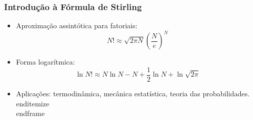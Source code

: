 \documentclass[11pt]{beamer}
\begin{document}
\begin{frame}

\begin{frame}
\frametitle{Introdução à Fórmula de Stirling}
\begin{itemize}
\item Aproximação assintótica para fatoriais:
\[ N! \approx \sqrt{2\pi N} \left( \frac{N}{e} \right)^N \]
\item Forma logarítmica:
\[ \ln N! \approx N \ln N - N + \frac{1}{2} \ln N + \ln \sqrt{2\pi} \]
\item Aplicações: termodinâmica, mecânica estatística, teoria das probabilidades.
\\end{itemize}
\\end{frame}



\end{itemize}
\end{frame}
\end{frame}
\end{document}
